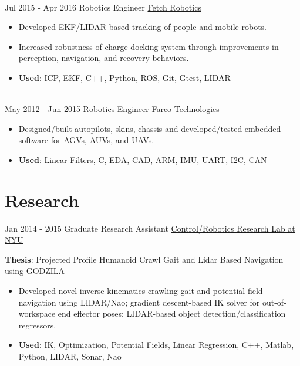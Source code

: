 \documentclass[letterpaper]{twentysecondcv} %
\begin{document}
\begin{twenty}
{{\begin{itemize}
        \end{itemize}}
        }
    \\   
    \twentyitem
   		{Jul 2015 -}
		{Apr 2016}
        {Robotics Engineer}
        {\href{http://www.fetchrobotics.com}{Fetch Robotics}}
        {}
        {
        {\begin{itemize}
          \item Developed EKF/LIDAR based tracking of people and mobile robots.
          \item Increased robustness of charge docking system through improvements in perception, navigation, and recovery behaviors.
          \item \textbf{Used}: ICP, EKF, C++, Python, ROS, Git, Gtest, LIDAR
        \end{itemize}}
        }
     \\
     \twentyitem
   		{May 2012 -}
		{Jun 2015}
        {Robotics Engineer}
        {\href{http://www.farcotech.com/}{Farco Technologies}}
        {}
        {
        {\begin{itemize}
          \item Designed/built autopilots, skins, chassis and developed/tested embedded software for AGVs, AUVs, and UAVs.
          \item \textbf{Used}: Linear Filters, C, EDA, CAD, ARM, IMU, UART, I2C, CAN
        \end{itemize}}
        }
        
\end{twenty}

\section{Research}
\begin{twenty}
	\twentyitem
    	{Jan 2014 -}
		{2015}
        {Graduate Research Assistant}
        {\href{http://crrl.poly.edu/}{Control/Robotics Research Lab at NYU}}
        {}
        {
       	\textbf{Thesis}: Projected Profile Humanoid Crawl Gait and Lidar Based Navigation using GODZILA
        {\begin{itemize}
          \item Developed novel inverse kinematics crawling gait and potential field navigation using LIDAR/Nao;
                gradient descent-based IK solver for out-of-workspace end effector poses;
                LIDAR-based object detection/classification regressors.
          \item \textbf{Used}: IK, Optimization, Potential Fields, Linear Regression, C++, Matlab, Python, LIDAR, Sonar, Nao
		\end{itemize}}
        }
\end{twenty}
\end{document}
